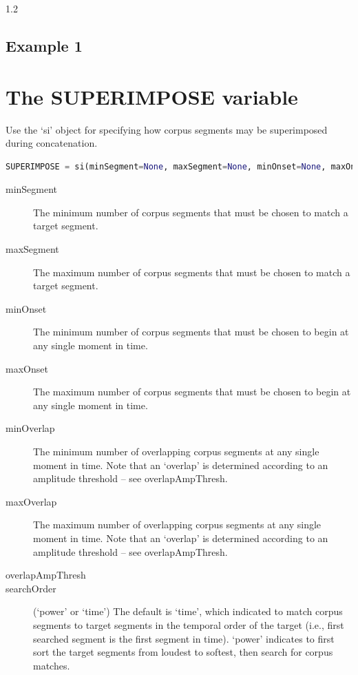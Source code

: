 \documentclass{article}
\begin{document}
\begin{spacing}{1.2}
\subsection{Example 1}





\section{The SUPERIMPOSE variable}
Use the `si' object for specifying how corpus segments may be superimposed during concatenation.

 \begin{lstlisting}[language=python]
SUPERIMPOSE = si(minSegment=None, maxSegment=None, minOnset=None, maxOnset=8, minOverlap=None, maxOverlap=None, overlapAmpThresh=-70., searchOrder='power', calcMethod='mixture', peakAlign=False)
\end{lstlisting}
 
\begin{description}

\item[minSegment] The minimum number of corpus segments that must be chosen to match a target segment.
\item[maxSegment] The maximum number of corpus segments that must be chosen to match a target segment.
\item[minOnset] The minimum number of corpus segments that must be chosen to begin at any single moment in time.
\item[maxOnset] The maximum number of corpus segments that must be chosen to begin at any single moment in time.
\item[minOverlap] The minimum number of overlapping corpus segments at any single moment in time.  Note that an `overlap' is determined according to an amplitude threshold -- see overlapAmpThresh.
\item[maxOverlap] The maximum number of overlapping corpus segments at any single moment in time.  Note that an `overlap' is determined according to an amplitude threshold -- see overlapAmpThresh.

\item[overlapAmpThresh] 

\item[searchOrder] (`power' or `time')  The default is `time', which indicated to match corpus segments to target segments in the temporal order of the target (i.e., first searched segment is the first segment in time).  `power' indicates to first sort the target segments from loudest to softest, then search for corpus matches.


\end{description}
\end{spacing}
\end{document}
